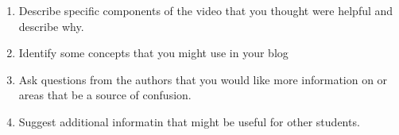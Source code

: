 \begin{enumerate}
  \item Describe specific components of the video that you thought were helpful and describe why.
  \item Identify some concepts that you might use in your blog
  \item Ask questions from the authors that you would like more information on or areas that be a source of confusion. 
  \item Suggest additional informatin that might be useful for other students.  
\end{enumerate}







